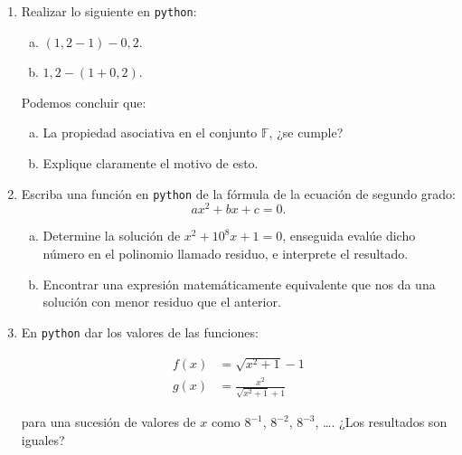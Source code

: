 \documentclass[
	spanish,
	9pt,
	utf8,
	xcolor=table,
	handout,
	aspectratio=1610,
	professionalfonts,
	notheorems,
	mathserif,
]{beamer}
\newcounter{savedenum}
\newcommand*{\saveenum}{\setcounter{savedenum}{\theenumi}}
\newcommand*{\resume}{\setcounter{enumi}{\thesavedenum}}
\begin{document}
\begin{frame}
	\begin{enumerate}
		\resume

		\item
		      Realizar lo siguiente en \texttt{python}:

		      \begin{multicols}{2}
			      \begin{enumerate}[a)]
				      \item
				            $\left(1,2-1\right)-0,2$.

				      \item
				            $1,2-\left(1+0,2\right)$.
			      \end{enumerate}
		      \end{multicols}

		      Podemos concluir que:

		      \begin{multicols}{2}
			      \begin{enumerate}[a)]
				      \item
				            La propiedad asociativa en el conjunto $\mathbb{F}$, ¿se cumple?
				      \item
				            Explique claramente el motivo de esto.
			      \end{enumerate}
		      \end{multicols}

		\item
		      Escriba una función en \texttt{python} de la fórmula de la ecuación de segundo grado:
		      \begin{equation*}
			      ax^{2}+bx+c=0.
		      \end{equation*}

		      \begin{enumerate}[a)]
			      \item
			            Determine la solución de $x^{2}+10^{8} x+1=0$, enseguida evalúe dicho número en el polinomio llamado residuo, e interprete el resultado.
			      \item
			            Encontrar una expresión matemáticamente equivalente que nos da una solución con menor residuo que el anterior.
		      \end{enumerate}

		\item
		      En \texttt{python} dar los valores de las funciones:

		      \begin{align*}
			      f\left(x\right) & =\sqrt{x^{2}+1}-1               \\
			      g\left(x\right) & =\frac{x^{2}}{\sqrt{x^{2}+1}+1}
		      \end{align*}

		      para una sucesión de valores de $x$ como $8^{-1}$, $8^{-2}$, $8^{-3}$, \ldots.
		      ¿Los resultados son iguales?

		      \saveenum
	\end{enumerate}
\end{frame}
\end{document}
